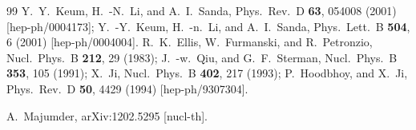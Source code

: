 \documentclass[aps,prd,preprint,tightenlines,superscriptaddress]{revtex4}
\begin{document}
\begin{thebibliography}{99}
  Y.~Y.~Keum, H.~-N.~Li, and A.~I.~Sanda,
  Phys.\ Rev.\ D {\bf 63}, 054008 (2001)
  [hep-ph/0004173];
  Y.~-Y.~Keum, H.~-n.~Li, and A.~I.~Sanda,
  Phys.\ Lett.\ B {\bf 504}, 6 (2001)
  [hep-ph/0004004].
  R.~K.~Ellis, W.~Furmanski, and R.~Petronzio,
  Nucl.\ Phys.\ B {\bf 212}, 29 (1983);
  J.~-w.~Qiu, and G.~F.~Sterman,
  Nucl.\ Phys.\ B {\bf 353}, 105 (1991);
  X.~Ji,
  Nucl.\ Phys.\ B {\bf 402}, 217 (1993);
  P.~Hoodbhoy, and X.~Ji,
  Phys.\ Rev.\ D {\bf 50}, 4429 (1994)
  [hep-ph/9307304].

  A.~Majumder,
  arXiv:1202.5295 [nucl-th].
\end{thebibliography}
\end{document}
